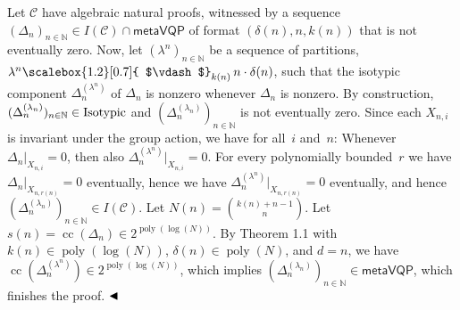 Let $\mathcal{C}$ have algebraic natural proofs, witnessed by a sequence $(\Delta_{n})_{n\in\mathbb{N}}\in I(\mathcal{C})\mathop{\cap}\mathsf{metaVQP}$ of format $(\delta(n),n,k(n))$ that is not eventually zero.
Now, let $(\lambda^{n})_{n\in\mathbb{N}}$ be a sequence of partitions, $\lambda^{n}\mathchoice{\scalebox{1.2}[0.7]{ $\vdash$}_{k(n)}\,}{\scalebox{1.2}[0.7]{ $\vdash$}_{k(n)}\,}{\scalebox{0.7}{\scalebox{1.2}[0.7]{$\vdash$}}_{k(n)}\,}{\scalebox{0.5}{\scalebox{1.2}[0.7]{$\vdash$}}_{k(n)}\,}{n\cdot\delta(n)}$, such that the isotypic component $\Delta_{n}^{(\lambda^{n})}$ of $\Delta_{n}$ is nonzero whenever $\Delta_{n}$ is nonzero.
By construction, $(\Delta_{n}^{(\lambda_{n})})_{n\in\mathbb{N}}\in\textup{{Isotypic}}$ and $(\Delta_{n}^{(\lambda_{n})})_{n\in\mathbb{N}}$ is not eventually zero.
Since each $X_{n,i}$ is invariant under the group action, we have for all $i$ and $n$:
Whenever $\Delta_{n}|_{X_{n,i}}=0$, then also $\Delta_{n}^{(\lambda^{n})}|_{X_{n,i}}=0$.
For every polynomially bounded $r$ we have
$\Delta_{n}|_{X_{n,r(n)}}=0$ eventually,
hence we have $\Delta_{n}^{(\lambda^{n})}|_{X_{n,r(n)}}=0$ eventually, and hence $(\Delta_{n}^{(\lambda_{n})})_{n\in\mathbb{N}}\in I(\mathcal{C})$.
Let $N(n)=\binom{k(n)+n-1}{n}$.
Let $s(n)=\operatorname{cc}(\Delta_{n})\in 2^{\operatorname{poly}(\log(N))}$.
By Theorem 1.1
with $k(n)\in\operatorname{poly}(\log(N))$, $\delta(n)\in\operatorname{poly}(N)$, and $d=n$, we
have $\operatorname{cc}(\Delta^{(\lambda^{n})}_{n})\in 2^{\operatorname{poly}(\log(N))}$,
which implies $(\Delta_{n}^{(\lambda_{n})})_{n\in\mathbb{N}}\in\mathsf{metaVQP}$,
which finishes the proof.
$\hfill\blacktriangleleft$





